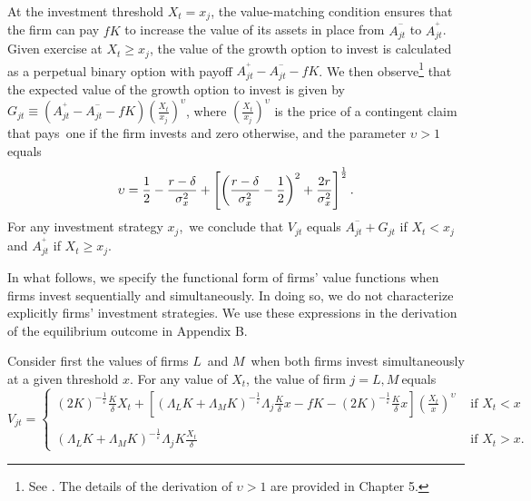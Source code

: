 \documentclass[nogrid,nosurname,sort&compress]{RFS}
\begin{document}

At the investment threshold $X_{t}=x_{j}$, the value-matching condition ensures that the firm can
pay $fK$ to increase the value of its assets in place from $A_{jt}^{^{-}}$ to $A_{jt}^{^{+}}$.
Given exercise at $X_{t}\geq x_{j}$, the value of the growth option to invest is calculated as a
perpetual binary option with payoff $A_{jt}^{^{+}}-A_{jt}^{^{-}}-fK$. We then observe\footnote{See
\cite{dixit}. The details of the derivation of $\upsilon >1$ are provided in Chapter 5.} that the
expected value of the growth option to invest is given by $G_{jt}\equiv \left(
A_{jt}^{^{+}}-A_{jt}^{^{-}}-fK\right) \left( \frac{X_{t}}{x_{j}}\right) ^{\upsilon }$, where
$\left( \frac{X_{t}}{x_{j}}\right) ^{\upsilon }$ is the price of a contingent claim that pays~one
if the firm invests and zero otherwise, and the parameter $\upsilon >1$ equals
\[
\upsilon =\frac{1}{2}-\frac{r-\delta }{\sigma _{x}^{2}}+\left[ \left( \frac{%
r-\delta }{\sigma _{x}^{2}}-\frac{1}{2}\right) ^{2}+\frac{2r}{\sigma _{x}^{2}%
}\right] ^{\frac{1}{2}}.
\]
\noindent For any investment strategy $x_{j}$,\ we conclude that $V_{jt}$ equals $%
A_{jt}^{^{-}}+G_{jt}$ if $X_{t}<x_{j}$ and $A_{jt}^{^{+}}$ if $%
X_{t}\geq x_{j}$.

In what follows, we specify the functional form of firms' value functions when firms invest
sequentially and simultaneously. In doing so, we do not characterize explicitly firms'
investment strategies.  We use these expressions in the derivation of the equilibrium outcome in
Appendix B.

Consider first the values of firms $L$\ and $M$\ when both firms invest simultaneously at a given
threshold $x$. For any value of $X_{t}$, the value of firm $j=L,M\ $equals
\[
V_{jt}=\left\{
\begin{array}{ll}
\left( 2K\right) ^{-\frac{1}{\varepsilon }}\frac{K}{\delta }X_{t}+\left[ \left( \Lambda
_{L}K+\Lambda _{M}K\right) ^{-\frac{1}{\varepsilon }}\Lambda
_{j}\frac{K}{\delta }x-fK-\left( 2K\right) ^{-\frac{1}{\varepsilon }}\frac{K%
}{\delta }x\right] \left( \frac{X_{t}}{x}\right) ^{\upsilon } & \text{ if }
X_{t}<x \\
&\\
\left( \Lambda _{L}K+\Lambda _{M}K\right) ^{-\frac{1}{\varepsilon }}\Lambda
_{j}K\frac{X_{t}}{\delta }  & \text{ if } X_{t}>x.
\end{array}%
\right.
\]
\end{document}
